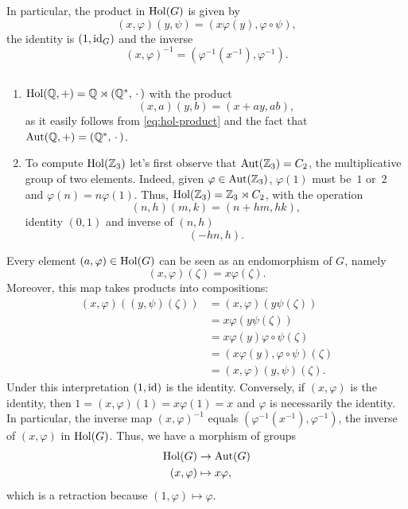 \begin{rem}
    In particular, the product in $\operatorname{Hol}(G)$ is given by
    \begin{equation}\label{eq:hol-product}
        (x,\varphi)(y,\psi) = (x\varphi(y),\varphi\circ\psi),
    \end{equation}
    the identity is $(1,\operatorname{id}_G)$ and the inverse
    \begin{equation}\label{eq:hol-inverse}
        (x,\varphi)^{-1} = (\varphi^{-1}(x^{-1}),\varphi^{-1}).
    \end{equation}
\end{rem}

\begin{xmpls}${}$
    \begin{enumerate}[\rm a)]
        \item $\operatorname{Hol}(\mathbb{Q},+)=\mathbb{Q}\rtimes(\mathbb{Q}^*,\,\cdot\,)$ with the product
        $$
            (x,a)(y,b)=(x+ay,ab),
        $$
        as it easily follows from \eqref{eq:hol-product} and the fact that ${\rm Aut}(\mathbb{Q},+)=(\mathbb{Q}^*,\,\cdot\,)$.

        \item To compute $\operatorname{Hol}(\mathbb{Z}_3)$ let's first observe that ${\rm Aut}(\mathbb{Z}_3)=C_2$, the multiplicative group of two elements. Indeed, given $\varphi\in{\rm Aut}(\mathbb{Z}_3)$, $\varphi(1)$ must be~$1$ or~$2$ and $\varphi(n)=n\varphi(1)$. Thus, $\operatorname{Hol}(\mathbb{Z}_3)=\mathbb{Z}_3\rtimes C_2$, with the operation
        $$
            (n,h)(m,k) = (n+hm, hk),
        $$
        identity $(0,1)$ and inverse of $(n,h)$
        $$
            (-hn,h).
        $$
    \end{enumerate}
\end{xmpls}

\begin{rem}\label{rem:Hol(G)}
    Every element $(a,\varphi)\in\operatorname{Hol}(G)$ can be seen as an endomorphism of $G$, namely
    $$
        (x,\varphi)(\zeta)=x\varphi(\zeta).
    $$
    Moreover, this map takes products into compositions:
    \begin{align*}
        (x,\varphi)((y,\psi)(\zeta))
            &= (x,\varphi)(y\psi(\zeta))\\
            &= x\varphi(y\psi(\zeta))\\
            &= x\varphi(y)\varphi\circ\psi(\zeta)\\
            &= (x\varphi(y),\varphi\circ\psi)(\zeta)\\
            &= (x,\varphi)(y,\psi)(\zeta).
    \end{align*}
    Under this interpretation $(1,\operatorname{id})$ is the identity. Conversely, if $(x,\varphi)$ is the identity, then $1=(x,\varphi)(1)=x\varphi(1)=x$ and $\varphi$ is necessarily the identity. In particular, the inverse map $(x,\varphi)^{-1}$ equals $(\varphi^{-1}(x^{-1}),\varphi^{-1})$, the inverse of $(x,\varphi)$ in $\operatorname{Hol}(G)$. Thus, we have a morphism of groups
    \begin{align*}
        \operatorname{Hol}(G)&\to{\rm Aut}(G)\\
        (x,\varphi)&\mapsto x\varphi,
    \end{align*}
    which is a retraction because $(1,\varphi)\mapsto\varphi$.
\end{rem}


